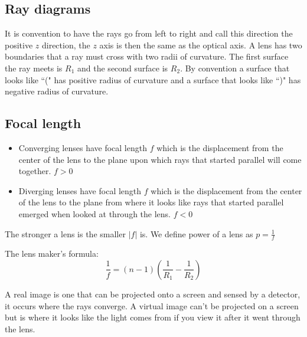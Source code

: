 \documentclass{article}
\begin{document}
\subsection*{Ray diagrams}

It is convention to have the rays go from left to right and call this direction the positive \(z\) direction, the \(z\) axis is then the same as the optical axis. A lens has two boundaries that a ray must cross with two radii of curvature. The first surface the ray meets is \(R_1\) and the second surface is \(R_2\). By convention a surface that looks like ``(" has positive radius of curvature and a surface that looks like ``)" has negative radius of curvature.

\subsection*{Focal length}

\begin{itemize}
\item Converging lenses have focal length \(f\) which is the displacement from the center of the lens to the plane upon which rays that started parallel will come together. \(f>0\)
\item Diverging lenses have focal length \(f\) which is the displacement from the center of the lens to the plane from where it looks like rays that started parallel emerged when looked at through the lens. \(f<0\)
\end{itemize}

The stronger a lens is the smaller \(|f|\) is. We define power of a lens as \(p=\frac 1f\)

The lens maker's formula:
\[\frac 1f=(n-1)\left(\frac{1}{R_1}-\frac{1}{R_2}\right)\]

A real image is one that can be projected onto a screen and sensed by a detector, it occurs where the rays converge. A virtual image can't be projected on a screen but is where it looks like the light comes from if you view it after it went through the lens.

\begin{center}
\end{center}
\end{document}
